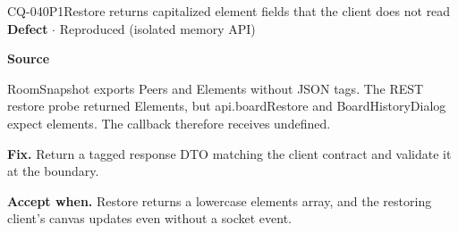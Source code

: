 \begin{finding}{CQ-040}{P1}{Restore returns capitalized element fields that the client does not read}
\textbf{Defect} $\cdot$ Reproduced (isolated memory API)\par
\textbf{Source}\quad{}\par
RoomSnapshot exports Peers and Elements without JSON tags. The REST restore probe returned Elements, but api.boardRestore and BoardHistoryDialog expect elements. The callback therefore receives undefined.\par
\textbf{Fix.} Return a tagged response DTO matching the client contract and validate it at the boundary.\par
\textbf{Accept when.} Restore returns a lowercase elements array, and the restoring client's canvas updates even without a socket event.
\end{finding}
\clearpage
